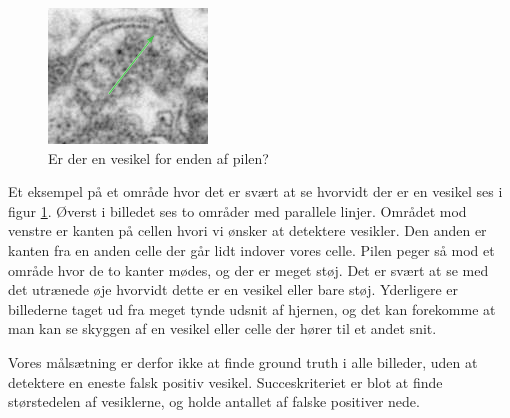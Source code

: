 \begin{figure}[H]
	\centering
	\includegraphics[scale=1.5]{files/intro/img/celle_questionves.png}
	\caption{Er der en vesikel for enden af pilen?\label{fig:intro_celle_question}}
\end{figure}

Et eksempel på et område hvor det er svært at se hvorvidt der er en vesikel ses i figur \ref{fig:intro_celle_question}. Øverst i billedet ses to områder med parallele linjer. Området mod venstre er kanten på cellen hvori vi ønsker at detektere vesikler. Den anden er kanten fra en anden celle der går lidt indover vores celle. Pilen peger så mod et område hvor de to kanter mødes, og der er meget støj. Det er svært at se med det utrænede øje hvorvidt dette er en vesikel eller bare støj. Yderligere er billederne taget ud fra meget tynde udsnit af hjernen, og det kan forekomme at man kan se skyggen af en vesikel eller celle der hører til et andet snit.  

Vores målsætning er derfor ikke at finde ground truth i alle billeder, uden at detektere en eneste falsk positiv vesikel. Succeskriteriet er blot at finde størstedelen af vesiklerne, og holde antallet af falske positiver nede.   



